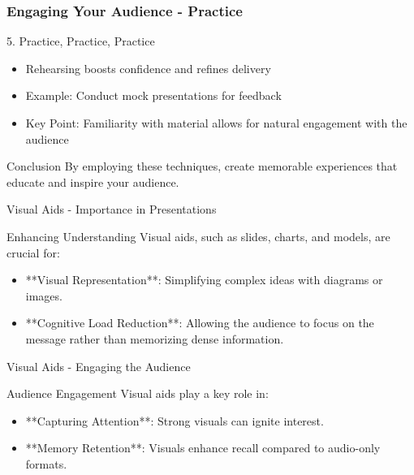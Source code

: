 \documentclass[aspectratio=169]{beamer}
\begin{document}
\begin{frame}[fragile]
    \frametitle{Engaging Your Audience - Practice}
    \begin{block}{5. Practice, Practice, Practice}
        \begin{itemize}
            \item Rehearsing boosts confidence and refines delivery
            \item Example: Conduct mock presentations for feedback
            \item Key Point: Familiarity with material allows for natural engagement with the audience
        \end{itemize}
    \end{block}
    
    \begin{block}{Conclusion}
        By employing these techniques, create memorable experiences that educate and inspire your audience.
    \end{block}
\end{frame}

\begin{frame}[fragile]{Visual Aids - Importance in Presentations}
    \begin{block}{Enhancing Understanding}
        Visual aids, such as slides, charts, and models, are crucial for:
        \begin{itemize}
            \item **Visual Representation**: Simplifying complex ideas with diagrams or images.
            \item **Cognitive Load Reduction**: Allowing the audience to focus on the message rather than memorizing dense information.
        \end{itemize}
    \end{block}
\end{frame}

\begin{frame}[fragile]{Visual Aids - Engaging the Audience}
    \begin{block}{Audience Engagement}
        Visual aids play a key role in:
        \begin{itemize}
            \item **Capturing Attention**: Strong visuals can ignite interest.
            \item **Memory Retention**: Visuals enhance recall compared to audio-only formats.
        \end{itemize}
    \end{block}
\end{frame}
\end{document}
